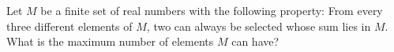 Let $M$ be a finite set of real numbers with the following property:
From every three different elements of $M$, two can always be selected whose sum lies in $M$.
What is the maximum number of elements $M$ can have?
